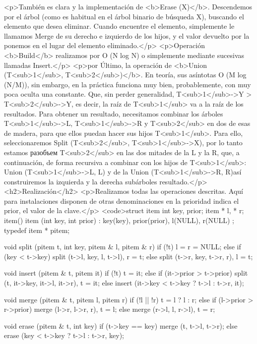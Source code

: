 <p>También es clara y la implementación de <b>Erase (X)</b>. Descendemos por el árbol (como es habitual en el árbol binario de búsqueda X), buscando el elemento que desea eliminar. Cuando encuentre el elemento, simplemente le llamamos Merge de su derecho e izquierdo de los hijos, y el valor devuelto por la ponemos en el lugar del elemento eliminado.</p>
<p>Operación <b>Build</b> realizamos por O (N log N) o simplemente mediante sucesivas llamadas Insert.</p>
<p>por Último, la operación de <b>Union (T<sub>1</sub>, T<sub>2</sub>)</b>. En teoría, sus asíntotas O (M log (N/M)), sin embargo, en la práctica funciona muy bien, probablemente, con muy poca oculta una constante. Que, sin perder generalidad, T<sub>1</sub>->Y > T<sub>2</sub>->Y, es decir, la raíz de T<sub>1</sub> va a la raíz de los resultados. Para obtener un resultado, necesitamos combinar los árboles T<sub>1</sub>->L, T<sub>1</sub>->R y T<sub>2</sub> en dos de esas de madera, para que ellos puedan hacer sus hijos T<sub>1</sub>. Para ello, seleccionaremos Split (T<sub>2</sub>, T<sub>1</sub>->X), por lo tanto estamos разобъем T<sub>2</sub> en las dos mitades de la L y la R, que, a continuación, de forma recursiva a combinar con los hijos de T<sub>1</sub>: Union (T<sub>1</sub>->L, L) y de la Union (T<sub>1</sub>->R, R)así construiremos la izquierda y la derecha subárboles resultado.</p>
<h2>Realización</h2>
<p>Realizamos todas las operaciones descritas. Aquí para instalaciones disponen de otras denominaciones en la prioridad indica el prior, el valor de la clave.</p>
<code>struct item {
int key, prior;
item * l, * r;
item() { }
item (int key, int prior) : key(key), prior(prior), l(NULL), r(NULL) { }
};
typedef item * pitem;

void split (pitem t, int key, pitem & l, pitem & r) {
if (!t)
l = r = NULL;
else if (key < t->key)
split (t->l, key, l, t->l), r = t;
else
split (t->r, key, t->r, r), l = t;
}

void insert (pitem & t, pitem it) {
if (!t)
t = it;
else if (it->prior > t->prior)
split (t, it->key, it->l, it->r), t = it;
else
insert (it->key < t->key ? t->l : t->r, it);
}

void merge (pitem & t, pitem l, pitem r) {
if (!l || !r)
t = l ? l : r;
else if (l->prior > r->prior)
merge (l->r, l->r, r), t = l;
else
merge (r->l, l, r->l), t = r;
}

void erase (pitem & t, int key) {
if (t->key == key)
merge (t, t->l, t->r);
else
erase (key < t->key ? t->l : t->r, key);
}

